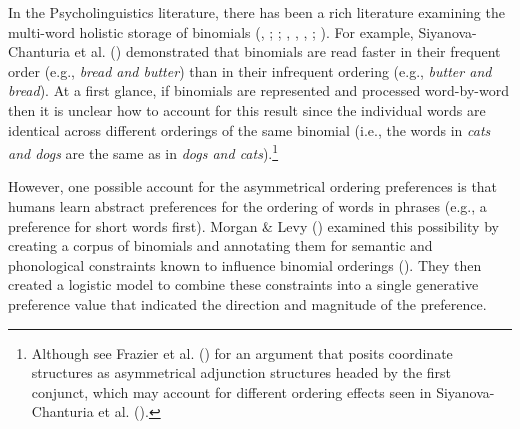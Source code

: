 \documentclass[
  12pt,
]{scrartcl}
\begin{document}
In the Psycholinguistics literature, there has been a rich literature
examining the multi-word holistic storage of binomials
(,
;
; , ,
,
;
). For example, Siyanova-Chanturia et al.
()
demonstrated that binomials are read faster in their frequent order
(e.g., \emph{bread and butter}) than in their infrequent ordering (e.g.,
\emph{butter and bread}). At a first glance, if binomials are
represented and processed word-by-word then it is unclear how to account
for this result since the individual words are identical across
different orderings of the same binomial (i.e., the words in \emph{cats
and dogs} are the same as in \emph{dogs and cats}).\footnote{Although
  see Frazier et al.
  () for
  an argument that posits coordinate structures as asymmetrical
  adjunction structures headed by the first conjunct, which may account
  for different ordering effects seen in Siyanova-Chanturia et al.
  ().}

However, one possible account for the asymmetrical ordering preferences
is that humans learn abstract preferences for the ordering of words in
phrases (e.g., a preference for short words first). Morgan \& Levy
() examined this
possibility by creating a corpus of binomials and annotating them for
semantic and phonological constraints known to influence binomial
orderings (). They then created a logistic model to combine these
constraints into a single generative preference value that indicated the
direction and magnitude of the preference.
\end{document}
